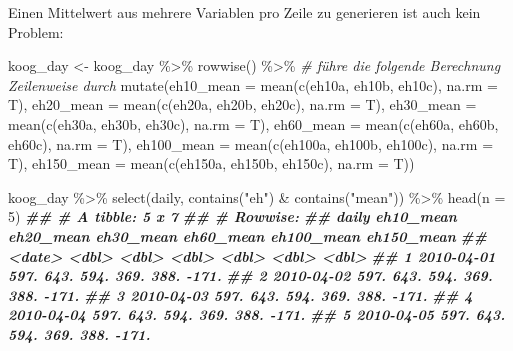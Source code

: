 \documentclass[
]{article}
\newenvironment{Shaded}{\begin{snugshade}}{\end{snugshade}}
\newcommand{\AttributeTok}[1]{\textcolor[rgb]{0.77,0.63,0.00}{#1}}
\newcommand{\CommentTok}[1]{\textcolor[rgb]{0.56,0.35,0.01}{\textit{#1}}}
\newcommand{\DecValTok}[1]{\textcolor[rgb]{0.00,0.00,0.81}{#1}}
\newcommand{\DocumentationTok}[1]{\textcolor[rgb]{0.56,0.35,0.01}{\textbf{\textit{#1}}}}
\newcommand{\FunctionTok}[1]{\textcolor[rgb]{0.00,0.00,0.00}{#1}}
\newcommand{\NormalTok}[1]{#1}
\newcommand{\OtherTok}[1]{\textcolor[rgb]{0.56,0.35,0.01}{#1}}
\newcommand{\SpecialCharTok}[1]{\textcolor[rgb]{0.00,0.00,0.00}{#1}}
\newcommand{\StringTok}[1]{\textcolor[rgb]{0.31,0.60,0.02}{#1}}
\begin{document}
Einen Mittelwert aus mehrere Variablen pro Zeile zu generieren ist auch kein Problem:

\begin{Shaded}
\begin{Highlighting}[]
\NormalTok{koog\_day }\OtherTok{\textless{}{-}}\NormalTok{ koog\_day }\SpecialCharTok{\%\textgreater{}\%}
  \FunctionTok{rowwise}\NormalTok{() }\SpecialCharTok{\%\textgreater{}\%} \CommentTok{\# führe die folgende Berechnung Zeilenweise durch}
  \FunctionTok{mutate}\NormalTok{(}\AttributeTok{eh10\_mean =} \FunctionTok{mean}\NormalTok{(}\FunctionTok{c}\NormalTok{(eh10a, eh10b, eh10c), }\AttributeTok{na.rm =}\NormalTok{ T),}
         \AttributeTok{eh20\_mean =} \FunctionTok{mean}\NormalTok{(}\FunctionTok{c}\NormalTok{(eh20a, eh20b, eh20c), }\AttributeTok{na.rm =}\NormalTok{ T),}
         \AttributeTok{eh30\_mean =} \FunctionTok{mean}\NormalTok{(}\FunctionTok{c}\NormalTok{(eh30a, eh30b, eh30c), }\AttributeTok{na.rm =}\NormalTok{ T),}
         \AttributeTok{eh60\_mean =} \FunctionTok{mean}\NormalTok{(}\FunctionTok{c}\NormalTok{(eh60a, eh60b, eh60c), }\AttributeTok{na.rm =}\NormalTok{ T),}
         \AttributeTok{eh100\_mean =} \FunctionTok{mean}\NormalTok{(}\FunctionTok{c}\NormalTok{(eh100a, eh100b, eh100c), }\AttributeTok{na.rm =}\NormalTok{ T),}
         \AttributeTok{eh150\_mean =} \FunctionTok{mean}\NormalTok{(}\FunctionTok{c}\NormalTok{(eh150a, eh150b, eh150c), }\AttributeTok{na.rm =}\NormalTok{ T)) }

\NormalTok{koog\_day }\SpecialCharTok{\%\textgreater{}\%}
  \FunctionTok{select}\NormalTok{(daily, }\FunctionTok{contains}\NormalTok{(}\StringTok{"eh"}\NormalTok{) }\SpecialCharTok{\&} \FunctionTok{contains}\NormalTok{(}\StringTok{"mean"}\NormalTok{)) }\SpecialCharTok{\%\textgreater{}\%}
  \FunctionTok{head}\NormalTok{(}\AttributeTok{n =} \DecValTok{5}\NormalTok{)}
\DocumentationTok{\#\# \# A tibble: 5 x 7}
\DocumentationTok{\#\# \# Rowwise: }
\DocumentationTok{\#\#   daily      eh10\_mean eh20\_mean eh30\_mean eh60\_mean eh100\_mean eh150\_mean}
\DocumentationTok{\#\#   \textless{}date\textgreater{}         \textless{}dbl\textgreater{}     \textless{}dbl\textgreater{}     \textless{}dbl\textgreater{}     \textless{}dbl\textgreater{}      \textless{}dbl\textgreater{}      \textless{}dbl\textgreater{}}
\DocumentationTok{\#\# 1 2010{-}04{-}01      597.      643.      594.      369.       388.      {-}171.}
\DocumentationTok{\#\# 2 2010{-}04{-}02      597.      643.      594.      369.       388.      {-}171.}
\DocumentationTok{\#\# 3 2010{-}04{-}03      597.      643.      594.      369.       388.      {-}171.}
\DocumentationTok{\#\# 4 2010{-}04{-}04      597.      643.      594.      369.       388.      {-}171.}
\DocumentationTok{\#\# 5 2010{-}04{-}05      597.      643.      594.      369.       388.      {-}171.}
\end{Highlighting}
\end{Shaded}
\end{document}

